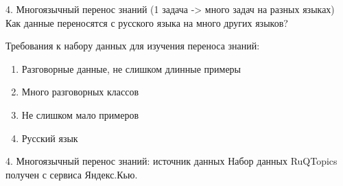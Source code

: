 \begin{frame}{4. Многоязычный перенос знаний (1 задача -> много задач на разных языках)}
Как данные переносятся с русского языка на много других языков? 

Требования к набору данных для изучения переноса знаний: 
\begin{enumerate}
\item {Разговорные данные, не слишком длинные примеры}
\item {Много разговорных классов}
\item {Не слишком мало примеров}
\item{Русский язык}
\end{enumerate}
\end{frame}

\begin{frame}{4. Многоязычный перенос знаний: источник данных}
Набор данных RuQTopics получен с сервиса Яндекс.Кью.
\begin{table}[htbp]
\caption{Размеры набора данных {RuQTopics} по классу и части}
{}
\end{table}
\end{frame}


